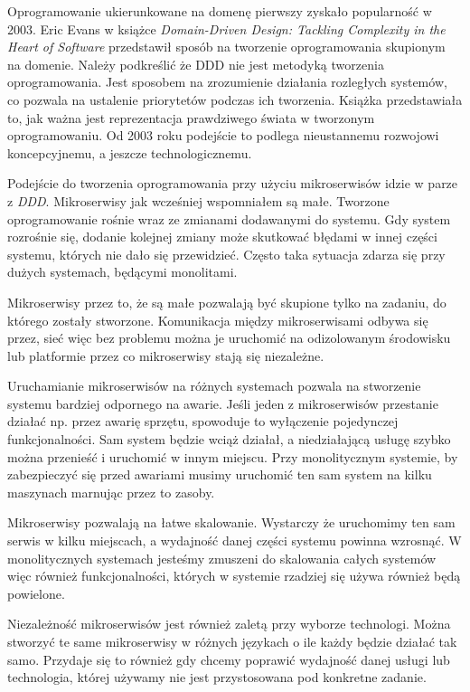 Oprogramowanie ukierunkowane na domenę pierwszy zyskało popularność w 2003. Eric Evans w książce \textsl{Domain-Driven Design: Tackling Complexity in the Heart of Software}\cite{ddd} przedstawił sposób na tworzenie oprogramowania skupionym na domenie. Należy podkreślić że DDD nie jest metodyką tworzenia oprogramowania. Jest sposobem na zrozumienie działania rozległych systemów, co pozwala na ustalenie priorytetów podczas ich tworzenia. Książka przedstawiała to, jak ważna jest reprezentacja prawdziwego świata w tworzonym oprogramowaniu. Od 2003 roku podejście to podlega nieustannemu rozwojowi koncepcyjnemu, a jeszcze technologicznemu.

Podejście do tworzenia oprogramowania przy użyciu mikroserwisów idzie w parze z \textsl{DDD}. Mikroserwisy jak wcześniej wspomniałem są małe. Tworzone oprogramowanie rośnie wraz ze zmianami dodawanymi do systemu. Gdy system rozrośnie się, dodanie kolejnej zmiany może skutkować błędami w innej części systemu, których nie dało się przewidzieć. Często taka sytuacja zdarza się przy dużych systemach, będącymi monolitami.

Mikroserwisy przez to, że są małe pozwalają być skupione tylko na zadaniu, do którego zostały stworzone. Komunikacja między mikroserwisami odbywa się przez, sieć więc bez problemu można je uruchomić na odizolowanym środowisku lub platformie przez co mikroserwisy stają się niezależne. 

 Uruchamianie mikroserwisów na różnych systemach pozwala na stworzenie systemu bardziej odpornego na awarie. Jeśli jeden z mikroserwisów przestanie działać np. przez awarię sprzętu, spowoduje to wyłączenie pojedynczej funkcjonalności. Sam system będzie wciąż działał, a niedziałającą usługę szybko można przenieść i uruchomić w innym miejscu. Przy monolitycznym systemie, by zabezpieczyć się przed awariami musimy uruchomić ten sam system na kilku maszynach marnując przez to zasoby.

Mikroserwisy pozwalają na łatwe skalowanie. Wystarczy że uruchomimy ten sam serwis w kilku miejscach, a wydajność danej części systemu powinna wzrosnąć. W monolitycznych systemach jesteśmy zmuszeni do skalowania całych systemów więc również funkcjonalności, których w systemie rzadziej się używa również będą powielone.

Niezależność mikroserwisów jest również zaletą przy wyborze technologi. Można stworzyć te same mikroserwisy w różnych językach o ile każdy będzie działać tak samo. Przydaje się to również gdy chcemy poprawić wydajność danej usługi lub technologia, której używamy nie jest przystosowana pod konkretne zadanie. 

